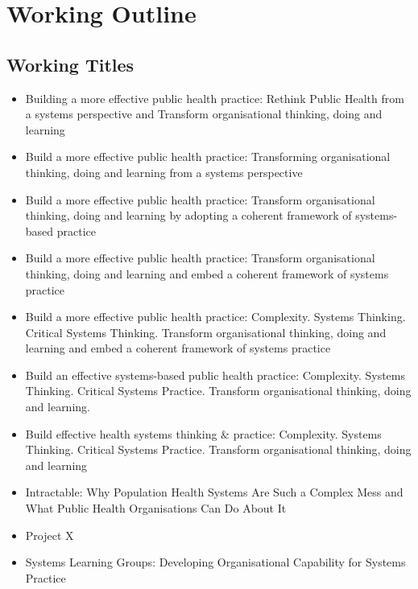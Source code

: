 \chapter*{Working Outline}

\section*{Working Titles}
\begin{itemize}
	\item Building a more effective public health practice: Rethink Public Health from a systems perspective and Transform organisational thinking, doing and learning
	\item Build a more effective public health practice: Transforming organisational thinking, doing and learning from a systems perspective
	\item Build a more effective public health practice: Transform organisational thinking, doing and learning by adopting a coherent framework of systems-based practice
	\item Build a more effective public health practice: Transform organisational thinking, doing and learning and embed a coherent framework of systems practice
	\item Build a more effective public health practice: Complexity. Systems Thinking. Critical Systems Thinking. Transform organisational thinking, doing and learning and embed a coherent framework of systems practice	
	\item Build an effective systems-based public health practice: Complexity. Systems Thinking. Critical Systems Practice. Transform organisational thinking, doing and learning.
	\item Build effective health systems thinking \& practice: Complexity. Systems Thinking. Critical Systems Practice. Transform organisational thinking, doing and learning
	\item Intractable: Why Population Health Systems Are Such a Complex Mess and What Public Health Organisations Can Do About It
	\item Project X
	\item Systems Learning Groups: Developing Organisational Capability for Systems Practice

\end{itemize}


